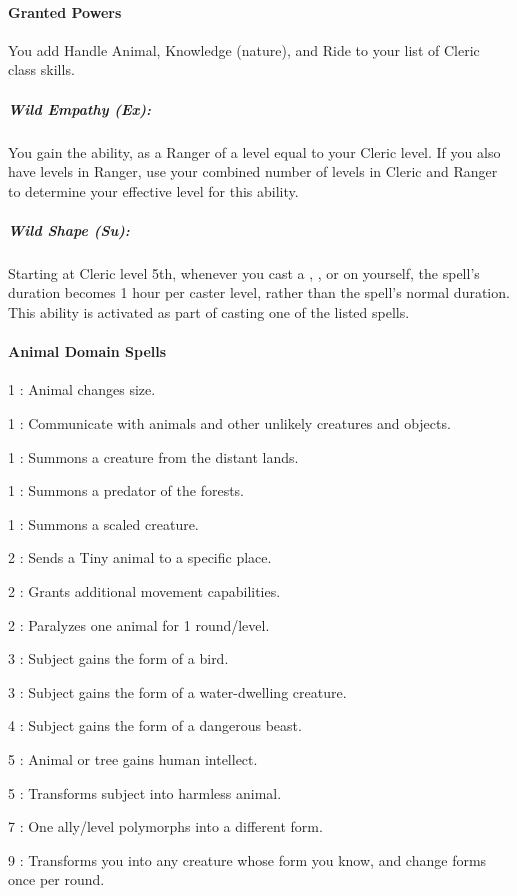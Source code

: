 \paragraph{Granted Powers}
You add Handle Animal, Knowledge (nature), and Ride to your list of Cleric class skills.
\subparagraph{Wild Empathy (Ex):}
You gain the  ability, as a Ranger of a level equal to your Cleric level.
If you also have levels in Ranger, use your combined number of levels in Cleric and Ranger to determine your effective level for this ability.
\subparagraph{Wild Shape (Su):}
Starting at Cleric level 5th, whenever you cast a , , 
 or  on yourself, 
the spell's duration becomes 1 hour per caster level, rather than the spell's normal duration.
This ability is activated as part of casting one of the listed spells.
\paragraph{Animal Domain Spells}
\begin{list}{}{\leftmargin=1em}
\item[1] : Animal changes size.
\item[1] : Communicate with animals and other unlikely creatures and objects.
\item[1] : Summons a creature from the distant lands.
\item[1] : Summons a predator of the forests.
\item[1] : Summons a scaled creature.
\item[2] : Sends a Tiny animal to a specific place.
\item[2] : Grants additional movement capabilities.
\item[2] : Paralyzes one animal for 1 round/level.
\item[3] : Subject gains the form of a bird.
\item[3] : Subject gains the form of a water-dwelling creature.
\item[4] : Subject gains the form of a dangerous beast.
\item[5] : Animal or tree gains human intellect.
\item[5] : Transforms subject into harmless animal.
\item[7] : One ally/level polymorphs into a different form.
\item[9] : Transforms you into any creature whose form you know, and change forms once per round.
\end{list}
